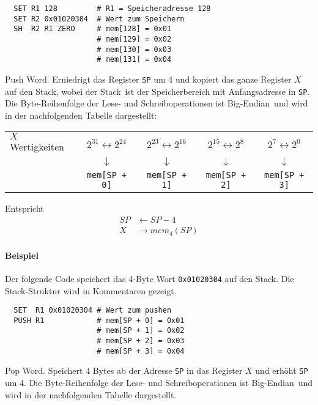 \begin{lstlisting}
  SET R1 128         # R1 = Speicheradresse 128
  SET R2 0x01020304  # Wert zum Speichern
  SH  R2 R1 ZERO     # mem[128] = 0x01
                     # mem[129] = 0x02
                     # mem[130] = 0x03
                     # mem[131] = 0x04
\end{lstlisting}




\glqq Push Word\grqq.
Erniedrigt das Register \texttt{SP} um 4 und kopiert das ganze Register $X$ auf
den Stack, wobei der \glqq Stack\grqq\ ist der Speicherbereich mit
Anfangsadresse in \texttt{SP}.
Die Byte-Reihenfolge der Lese- und Schreiboperationen ist \glqq Big-Endian\grqq\
und wird in der nachfolgenden Tabelle dargestellt:
\begin{center}
\begin{tabular}{l|cccc}
  \toprule
  $X$  Wertigkeiten &
  $2^{31} \leftrightarrow 2^{24}$ &
  $2^{23} \leftrightarrow 2^{16}$ &
  $2^{15} \leftrightarrow 2^{8}$  &
  $2^{7}  \leftrightarrow 2^{0}$ 
  \\
  &
  $\downarrow$ & $\downarrow$ & $\downarrow$ & $\downarrow$ 
  \\
  \text{Stack-Bereich} &
  \texttt{mem[SP + 0]} &
  \texttt{mem[SP + 1]} &
  \texttt{mem[SP + 2]} &
  \texttt{mem[SP + 3]}
  \\\bottomrule
\end{tabular}
\end{center}


Entspricht
\begin{align*}
  SP & \gets SP - 4    \\
  X  & \to mem_{4}(SP)
\end{align*}

\paragraph{Beispiel}
Der folgende Code speichert das 4-Byte Wort \texttt{0x01020304} auf den Stack.
Die Stack-Struktur wird in Kommentaren gezeigt.
\begin{lstlisting}
  SET  R1 0x01020304 # Wert zum pushen
  PUSH R1            # mem[SP + 0] = 0x01
                     # mem[SP + 1] = 0x02
                     # mem[SP + 2] = 0x03
                     # mem[SP + 3] = 0x04
\end{lstlisting}




\glqq Pop Word\grqq.
Speichert 4 Bytes ab der Adresse \texttt{SP} in das Register $X$ und erhöht
\texttt{SP} um 4.
Die Byte-Reihenfolge der Lese- und Schreiboperationen ist \glqq Big-Endian\grqq\
und wird in der nachfolgenden Tabelle dargestellt.

